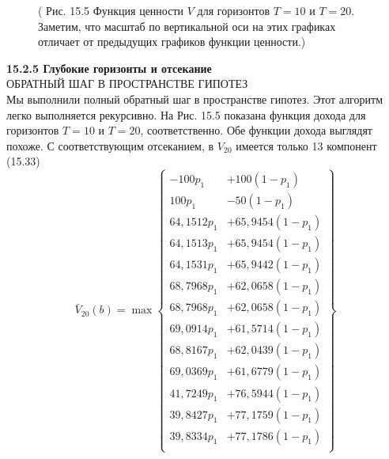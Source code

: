 \documentclass[10pt,a4paper]{article}
\begin{document}
\begin{figure}[H]
	\caption{ ( Рис. 15.5 Функция ценности $V$ для горизонтов $T = 10$ и $T = 20$. Заметим, что масштаб по вертикальной оси на этих графиках отличает от предыдущих графиков функции ценности.) }
	\label{fig:155orig}
\end{figure}

\textbf{15.2.5	Глубокие горизонты и отсекание}\\

ОБРАТНЫЙ ШАГ В ПРОСТРАНСТВЕ ГИПОТЕЗ\\

Мы выполнили полный обратный шаг в пространстве гипотез. Этот алгоритм легко выполняется рекурсивно.
На Рис. 15.5 показана функция дохода для горизонтов $T = 10$ и $T = 20$, соответственно. Обе функции дохода выглядят похоже. С соответствующим отсеканием, в $V_{20}$ имеется только 13 компонент\\

(15.33)
\begin{equation*}
\bar{V}_{20}(b)=\max\left\{
\begin{array}{rr}
-100p_1&+100(1-p_1)\\
100p_1&-50(1-p_1)\\
64,1512p_1&+65,9454(1-p_1)\\
64,1513p_1&+65,9454(1-p_1)\\
64,1531p_1&+65,9442(1-p_1)\\
68,7968p_1&+62,0658(1-p_1)\\
68,7968p_1&+62,0658(1-p_1)\\
69,0914p_1&+61,5714(1-p_1)\\
68,8167p_1&+62,0439(1-p_1)\\
69,0369p_1&+61,6779(1-p_1)\\
41,7249p_1&+76,5944(1-p_1)\\
39,8427p_1&+77,1759(1-p_1)\\
39,8334p_1&+77,1786(1-p_1)\\
\end{array}
\right\}
\end{equation*}
\end{document}

